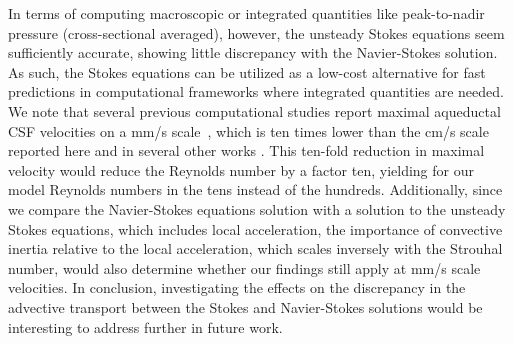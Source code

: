 \documentclass{template}
\begin{document}
In terms of computing macroscopic or integrated quantities like peak-to-nadir pressure (cross-sectional averaged),
however, the unsteady Stokes equations seem sufficiently accurate, showing little discrepancy with
the Navier-Stokes solution. As such, the Stokes equations can be
utilized as a low-cost alternative for fast predictions
in computational frameworks where integrated quantities are needed.
We note that several previous computational studies report maximal aqueductal
CSF velocities on a mm/s scale~\citep{enzmann1993cerebrospinal, enzmann1991normal,
Causemann2022HumanFramework, Sweetman2011ThreeDimensional, howden2008three, wagshul2011pulsating,
greitz1993pulsatile, sweetman2011cerebrospinal}, which is ten times lower than the
cm/s scale reported here and in several other works
\citep{kim1999quantitative, nitz1992flow, Kurtcuoglu2007ComputationalSylvius}. 
This ten-fold reduction in maximal velocity would reduce the Reynolds number
by a factor ten, yielding for our model Reynolds numbers in the tens instead of the hundreds.
Additionally, since we compare the Navier-Stokes equations solution with a solution to the unsteady
Stokes equations, which includes local acceleration, the importance of convective inertia
relative to the local acceleration, which scales inversely with the Strouhal number,
would also determine whether our findings still apply at mm/s scale velocities.
In conclusion, investigating the effects on the discrepancy in the advective transport
between the Stokes and Navier-Stokes solutions would be interesting to address further in future work.
\end{document}
